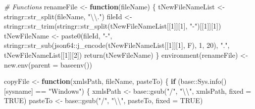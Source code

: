 \documentclass[
]{article}
\newenvironment{Shaded}{\begin{snugshade}}{\end{snugshade}}
\newcommand{\AttributeTok}[1]{\textcolor[rgb]{0.77,0.63,0.00}{#1}}
\newcommand{\CommentTok}[1]{\textcolor[rgb]{0.56,0.35,0.01}{\textit{#1}}}
\newcommand{\ConstantTok}[1]{\textcolor[rgb]{0.00,0.00,0.00}{#1}}
\newcommand{\ControlFlowTok}[1]{\textcolor[rgb]{0.13,0.29,0.53}{\textbf{#1}}}
\newcommand{\DecValTok}[1]{\textcolor[rgb]{0.00,0.00,0.81}{#1}}
\newcommand{\FunctionTok}[1]{\textcolor[rgb]{0.00,0.00,0.00}{#1}}
\newcommand{\NormalTok}[1]{#1}
\newcommand{\OtherTok}[1]{\textcolor[rgb]{0.56,0.35,0.01}{#1}}
\newcommand{\SpecialCharTok}[1]{\textcolor[rgb]{0.00,0.00,0.00}{#1}}
\newcommand{\StringTok}[1]{\textcolor[rgb]{0.31,0.60,0.02}{#1}}
\begin{document}
\begin{Shaded}
\begin{Highlighting}[]
\CommentTok{\# Functions}
\NormalTok{renameFile }\OtherTok{\textless{}{-}} \ControlFlowTok{function}\NormalTok{(fileName) \{}
\NormalTok{  tNewFileNameList }\OtherTok{\textless{}{-}}\NormalTok{ stringr}\SpecialCharTok{::}\FunctionTok{str\_split}\NormalTok{(fileName, }\StringTok{"}\SpecialCharTok{\textbackslash{}\textbackslash{}}\StringTok{."}\NormalTok{)}
\NormalTok{  fileId }\OtherTok{\textless{}{-}}\NormalTok{ stringr}\SpecialCharTok{::}\FunctionTok{str\_trim}\NormalTok{(stringr}\SpecialCharTok{::}\FunctionTok{str\_split}\NormalTok{(tNewFileNameList[[}\DecValTok{1}\NormalTok{]][}\DecValTok{1}\NormalTok{], }\StringTok{"{-}"}\NormalTok{)[[}\DecValTok{1}\NormalTok{]][}\DecValTok{1}\NormalTok{])}
\NormalTok{  tNewFileName }\OtherTok{\textless{}{-}} \FunctionTok{paste0}\NormalTok{(fileId, }\StringTok{"{-}"}\NormalTok{, stringr}\SpecialCharTok{::}\FunctionTok{str\_sub}\NormalTok{(json64}\SpecialCharTok{::}\FunctionTok{j\_encode}\NormalTok{(tNewFileNameList[[}\DecValTok{1}\NormalTok{]][}\DecValTok{1}\NormalTok{], F), }\DecValTok{1}\NormalTok{, }\DecValTok{20}\NormalTok{), }\StringTok{"."}\NormalTok{, tNewFileNameList[[}\DecValTok{1}\NormalTok{]][}\DecValTok{2}\NormalTok{])}
  \FunctionTok{return}\NormalTok{(tNewFileName)}
\NormalTok{\}}
\FunctionTok{environment}\NormalTok{(renameFile) }\OtherTok{\textless{}{-}} \FunctionTok{new.env}\NormalTok{(}\AttributeTok{parent =} \FunctionTok{baseenv}\NormalTok{())}

\NormalTok{copyFile }\OtherTok{\textless{}{-}} \ControlFlowTok{function}\NormalTok{(xmlsPath, fileName, pasteTo) \{}
  \ControlFlowTok{if}\NormalTok{ (base}\SpecialCharTok{::}\FunctionTok{Sys.info}\NormalTok{()[}\StringTok{\textquotesingle{}sysname\textquotesingle{}}\NormalTok{] }\SpecialCharTok{==} \StringTok{"Windows"}\NormalTok{) \{}
\NormalTok{    xmlsPath }\OtherTok{\textless{}{-}}\NormalTok{  base}\SpecialCharTok{::}\FunctionTok{gsub}\NormalTok{(}\StringTok{"/"}\NormalTok{, }\StringTok{"}\SpecialCharTok{\textbackslash{}\textbackslash{}}\StringTok{"}\NormalTok{, xmlsPath, }\AttributeTok{fixed =} \ConstantTok{TRUE}\NormalTok{)}
\NormalTok{    pasteTo }\OtherTok{\textless{}{-}}\NormalTok{  base}\SpecialCharTok{::}\FunctionTok{gsub}\NormalTok{(}\StringTok{"/"}\NormalTok{, }\StringTok{"}\SpecialCharTok{\textbackslash{}\textbackslash{}}\StringTok{"}\NormalTok{, pasteTo, }\AttributeTok{fixed =} \ConstantTok{TRUE}\NormalTok{)}
    

\end{Highlighting}
\end{Shaded}
\end{document}
